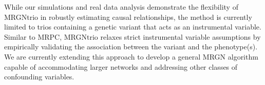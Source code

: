 \documentclass[12pt,letterpaper]{report}
\begin{document}
\begin{doublespace}
While our simulations and real data analysis demonstrate the flexibility of MRGNtrio in robustly estimating causal relationships, the method is currently limited to trios containing a genetic variant that acts as an instrumental variable. Similar to MRPC, MRGNtrio relaxes strict instrumental variable assumptions by empirically validating the association between the variant and the phenotype(s). We are currently extending this approach to develop a general MRGN algorithm capable of accommodating larger networks and addressing other classes of confounding variables.

%
%
%

\end{doublespace}
\end{document}
